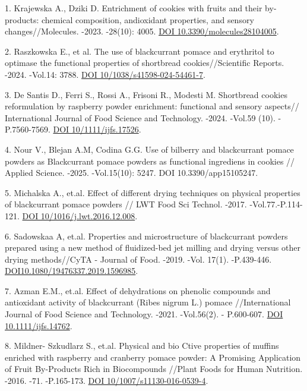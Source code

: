 \begin{refs}
1. Krajewska A., Dziki D. Entrichment of cookies with fruits and their
by-products: chemical composition, andioxidant properties, and sensory
changes//Molecules. -2023. -28(10): 4005.
\href{https://doi.org/10.3390/molecules28104005}{DOI
10.3390/molecules28104005}.

2. Raszkowska E., et al. The use of blackcurrant pomace and erythritol
to optimase the functional properties of shortbread cookies//Scientific
Reports. -2024. -Vol.14: 3788.
\href{https://doi.org/10/1038/s41598-024-54461-7}{DOI
10/1038/s41598-024-54461-7}.

3. De Santis D., Ferri S., Rossi A., Frisoni R., Modesti M. Shortbread
cookies reformulation by raspberry powder enrichment: functional and
sensory aspects// International Journal of Food Science and Technology.
-2024. -Vol.59 (10). - P.7560-7569.
\href{https://doi.org/10/1111/ijfs.17526}{DOI 10/1111/ijfs.17526}.

4. Nour V., Blejan A.M, Codina G.G. Use of bilberry and blackcurrant
pomace powders as Blackcurrant pomace powders as functional ingrediens
in cookies // Applied Science. -2025. -Vol.15(10): 5247. DOI
10.3390/app15105247.

5. Michalska A., et.al. Effect of different drying techniques on
physical properties of blackcurrant pomace powders // LWT Food Sci
Technol. -2017. -Vol.77.-P.114-121.
\href{https://doi.org/10/1016/j.lwt.2016.12.008}{DOI
10/1016/j.lwt.2016.12.008}.

6. Sadowskaa A, et.al. Properties and microstructure of blackcurrant
powders prepared using a new method of fluidized-bed jet milling and
drying versus other drying methods//CyTA - Journal of Food. -2019. -Vol.
17(1). -P.439-446.
\href{https://doi.org/10.1080/19476337.2019.1596985}{DOI10.1080/19476337.2019.1596985}.

7. Azman E.M., et.al. Effect of dehydrations on phenolic compounds and
antioxidant activity of blackcurrant (Ribes nigrum L.) pomace
//International Journal of Food Science and Technology. -2021.
-Vol.56(2). - P.600-607. \href{https://doi.org/10.1111/ijfs.14762}{DOI
10.1111/ijfs.14762}.

8. Mildner- Szkudlarz S., et.al. Physical and bio Ctive properties of
muffins enriched with raspberry and cranberry pomace powder: A Promising
Application of Fruit By-Products Rich in Biocompounds //Plant Foods for
Human Nutrition. -2016. -71. -P.165-173.
\href{https://doi/org/10/1007/s11130-016-0539-4}{DOI
10/1007/s11130-016-0539-4}.


\end{refs}

